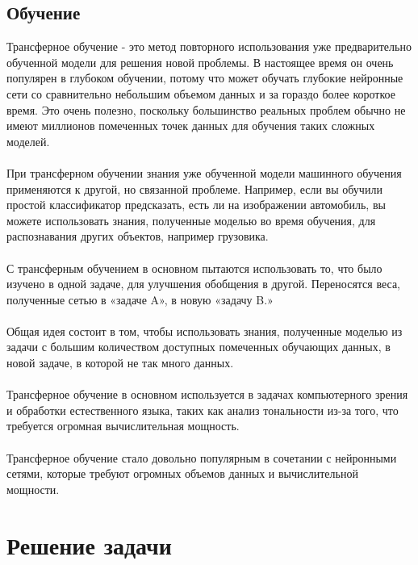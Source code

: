 \documentclass[12pt,a4paper]{article}
\newcommand{\названиеРаботы}
{Разработка модели сверточной нейронной сети, обученную на сгенерированных размеченных данных СКТ}
\newcommand{\идРаботы}
{8888.00.0019-0019/001}
\newcommand{\темаРаботы}
{СКТ}
\newcommand{\номерСлужебки}
{}
\newcommand{\ДолжностьАвтораОтчета}{Инженер}
\newcommand{\НашОтдел}{Научно-исследовательский центр суперкомпьютерных технологий}
\newcommand{\НазваниеДокумента}{Служебная записка}
\newcommand{\КомуСлужебкаДолжность}{Заместителю технического директора}
\newcommand{\КомуСлужебкаФИО}{Никитушкину М.В.}
\newcommand{\ОтКогоСлужебкаДолжность}{\ДолжностьАвтораОтчета}
\newcommand{\ОтКогоСлужебкаФИО}{Ниженко И.А.}
\newcommand{\ИсполнительФИО}{Ниженко И.А. \\тел.:    75-39}
\begin{document}
	\subsection{Обучение}
	Трансферное обучение - это метод повторного использования уже предварительно обученной модели для решения новой проблемы. В настоящее время он очень популярен в глубоком обучении, потому что может обучать глубокие нейронные сети со сравнительно небольшим объемом данных и за гораздо более короткое время. Это очень полезно, поскольку большинство реальных проблем обычно не имеют миллионов помеченных точек данных для обучения таких сложных моделей.
	\\\\
	При трансферном обучении знания уже обученной модели машинного обучения применяются к другой, но связанной проблеме. Например, если вы обучили простой классификатор предсказать, есть ли на изображении автомобиль, вы можете использовать знания, полученные моделью во время обучения, для распознавания других объектов, например грузовика.
	\\\\
	С трансферным обучением в основном пытаются использовать то, что было изучено в одной задаче, для улучшения обобщения в другой. Переносятся веса, полученные сетью в «задаче A», в новую «задачу B.»
	\\\\
	Общая идея состоит в том, чтобы использовать знания, полученные моделью из задачи с большим количеством доступных помеченных обучающих данных, в новой задаче, в которой не так много данных.
	\\\\
	Трансферное обучение в основном используется в задачах компьютерного зрения и обработки естественного языка, таких как анализ тональности из-за того, что требуется огромная вычислительная мощность.
	\\\\
	Трансферное обучение стало довольно популярным в сочетании с нейронными сетями, которые требуют огромных объемов данных и вычислительной мощности.
	\newpage
	
	\section{Решение задачи}
	
	\pagebreak
\end{document}
